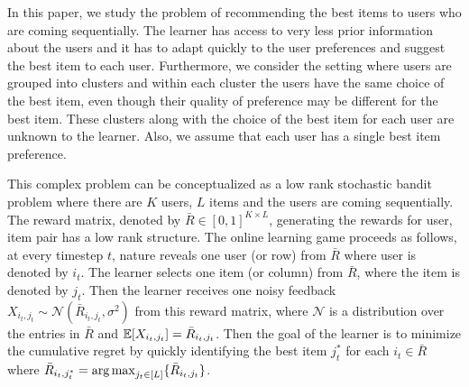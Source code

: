 In this paper, we study the problem of recommending the best items to users who are coming sequentially. The learner has access to very less prior information about the users and it has to adapt quickly to the user preferences and suggest the best item to each user. Furthermore, we consider the setting where users are grouped into clusters and within each cluster the users have the same choice of the best item, even though their quality of preference may be different for the best item. These clusters along with the choice of the best item for each user are unknown to the learner.  Also, we assume that each user has a single best item preference.

	This complex problem can be conceptualized as a low rank stochastic bandit problem where there are $K$ users, $L$ items and the users are coming sequentially. The reward matrix, denoted by $\bar{R}\in [0,1]^{K\times L}$,  generating the rewards for user, item pair has a low rank structure. The online learning game proceeds as follows, at every timestep $t$,  nature reveals one user (or row) from $\bar{R}$ where user is denoted by $i_t$. The learner selects one item (or column) from $\bar{R}$, where the item is denoted by $j_t$. Then the learner receives one noisy feedback $X_{i_t,j_t}\sim\mathcal{N}(\bar{R}_{i_t,j_t},\sigma^2)$ from this reward matrix, where $\mathcal{N}$ is a distribution over the entries in $\bar{R}$ and $\mathbb{E}[X_{i_t,j_t}] = \bar{R}_{i_t,j_t}$. Then the goal of the learner is to minimize the cumulative regret by quickly identifying the best item $j^*_t$ for each $i_t\in \bar{R}$ where $\bar{R}_{i_t,j^*_t} = \mathop{\rm arg\,max} _{j_t\in[L]}\lbrace \bar{R}_{i_t,j_t} \rbrace$. %